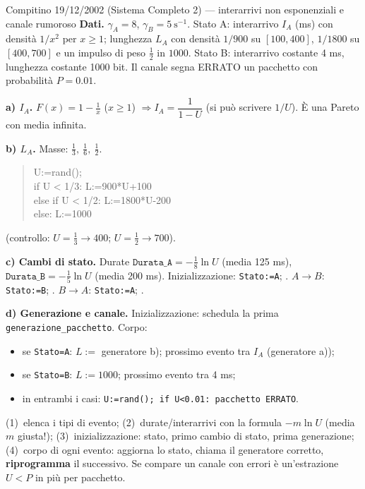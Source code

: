 \begin{esempio}{Compitino 19/12/2002 (Sistema Completo 2) --- interarrivi non esponenziali e canale rumoroso}
\textbf{Dati.} $\gamma_A=8$, $\gamma_B=5\ \mathrm{s^{-1}}$. Stato A: interarrivo $I_A$ (ms) con densità $1/x^2$ per $x\ge1$; lunghezza $L_A$ con densità $1/900$ su $[100,400]$, $1/1800$ su $[400,700]$ e un impulso di peso $\tfrac12$ in $1000$. Stato B: interarrivo costante 4 ms, lunghezza costante 1000 bit. Il canale segna ERRATO un pacchetto con probabilità $P=0.01$.

\textbf{a) $I_A$.} $F(x)=1-\tfrac1x$ ($x\ge1$) $\Rightarrow I_A=\dfrac1{1-U}$ (si può scrivere $1/U$). È una Pareto con media infinita.

\textbf{b) $L_A$.} Masse: $\tfrac13,\ \tfrac16,\ \tfrac12$.
\begin{quote}\ttfamily\small
U:=rand();\\
if U < 1/3: L:=900*U+100\\
else if U < 1/2: L:=1800*U-200\\
else: L:=1000
\end{quote}
(controllo: $U=\tfrac13\to400$; $U=\tfrac12\to700$).

\textbf{c) Cambi di stato.} Durate $\texttt{Durata\_A}=-\tfrac18\ln U$ (media 125 ms), $\texttt{Durata\_B}=-\tfrac15\ln U$ (media 200 ms). Inizializzazione: \texttt{Stato:=A}; . $A\to B$: \texttt{Stato:=B}; . $B\to A$: \texttt{Stato:=A}; .

\textbf{d) Generazione e canale.} Inizializzazione: schedula la prima \texttt{generazione\_pacchetto}. Corpo:
\begin{itemize}[nosep]
\item se \texttt{Stato=A}: $L:=$ generatore b); prossimo evento tra $I_A$ (generatore a));
\item se \texttt{Stato=B}: $L:=1000$; prossimo evento tra 4 ms;
\item in entrambi i casi: \texttt{U:=rand(); if U<0.01: pacchetto ERRATO}.
\end{itemize}
\end{esempio}

\begin{nota}
(1)~elenca i tipi di evento; (2)~durate/interarrivi con la formula $-m\ln U$ (media $m$ giusta!); (3)~inizializzazione: stato, primo cambio di stato, prima generazione; (4)~corpo di ogni evento: aggiorna lo stato, chiama il generatore corretto, \textbf{riprogramma} il successivo. Se compare un canale con errori è un'estrazione $U<P$ in più per pacchetto.
\end{nota}

